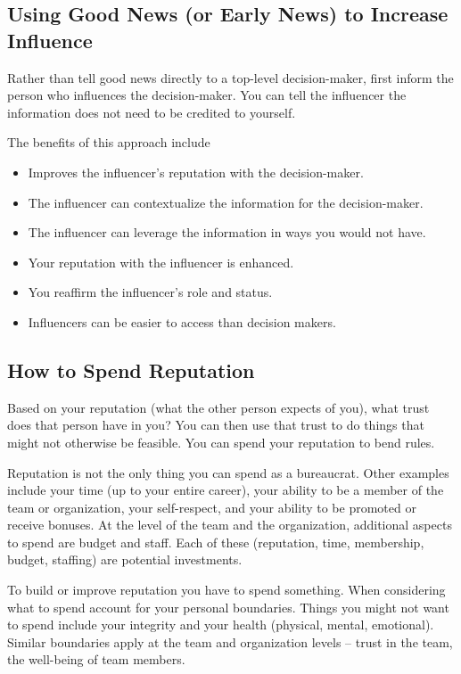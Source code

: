 \subsection*{Using Good News (or Early News) to Increase Influence}

Rather than tell good news directly to a top-level decision-maker, first inform the person who influences the decision-maker.
You can tell the influencer the information does not need to be credited to yourself.

The benefits of this approach include
\begin{itemize}
    \item Improves the influencer's reputation with the decision-maker.
    \item The influencer can contextualize the information for the decision-maker.
    \item The influencer can leverage the information in ways you would not have.
    \item Your reputation with the influencer is enhanced.
    \item You reaffirm the influencer's role and status.
    \item Influencers can be easier to access than decision makers.
\end{itemize}

\subsection*{How to Spend Reputation}

Based on your reputation (what the other person expects of you), what trust does that person have in you?  You can then use that trust to do things that might not otherwise be feasible. You can spend your reputation to bend  rules. 

Reputation is not the only thing you can spend as a bureaucrat. Other examples include your time (up to your entire career), your ability to be a member of the team or organization, your self-respect, and your ability to be promoted or receive bonuses. At the level of the team and the organization, additional aspects to spend are  budget and  staff. Each of these (reputation, time, membership, budget, staffing) are potential investments. 

To build or improve reputation you have to spend something.
When considering what to spend account for your personal boundaries. 
Things you might not want to spend include your integrity and your health (physical, mental, emotional). Similar boundaries apply at the team and organization levels -- trust in the team, the well-being of team members. 


